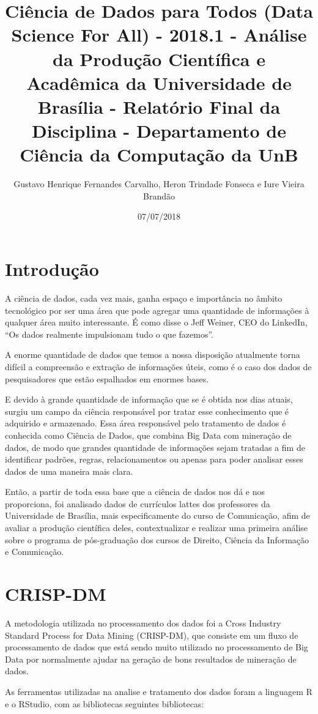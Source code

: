 \documentclass[]{article}
\title{Ciência de Dados para Todos (Data Science For All) - 2018.1 - Análise da
Produção Científica e Acadêmica da Universidade de Brasília - Relatório
Final da Disciplina - Departamento de Ciência da Computação da UnB}
\author{Gustavo Henrique Fernandes Carvalho, Heron Trindade Fonseca e Iure
Vieira Brandão}
\date{07/07/2018}
\begin{document}
\maketitle

\section{Introdução}\label{introducao}

A ciência de dados, cada vez mais, ganha espaço e importância no âmbito
tecnológico por ser uma área que pode agregar uma quantidade de
informações à qualquer área muito interessante. É como disse o Jeff
Weiner, CEO do LinkedIn, ``Os dados realmente impulsionam tudo o que
fazemos''.

A enorme quantidade de dados que temos a nossa disposição atualmente
torna difícil a compreensão e extração de informações úteis, como é o
caso dos dados de pesquisadores que estão espalhados em enormes bases.

E devido à grande quantidade de informação que se é obtida nos dias
atuais, surgiu um campo da ciência responsável por tratar esse
conhecimento que é adquirido e armazenado. Essa área responsável pelo
tratamento de dados é conhecida como Ciência de Dados, que combina Big
Data com mineração de dados, de modo que grandes quantidade de
informações sejam tratadas a fim de identificar padrões, regras,
relacionamentos ou apenas para poder analisar esses dados de uma maneira
mais clara.

Então, a partir de toda essa base que a ciência de dados nos dá e nos
proporciona, foi analisado dados de currículos lattes dos professores da
Universidade de Brasília, mais especificamente do curso de Comunicação,
afim de avaliar a produção científica deles, contextualizar e realizar
uma primeira análise sobre o programa de pós-graduação dos cursos de
Direito, Ciência da Informação e Comunicação.

\section{CRISP-DM}\label{crisp-dm}

A metodologia utilizada no processamento dos dados foi a Cross Industry
Standard Process for Data Mining (CRISP-DM), que consiste em um fluxo de
processamento de dados que está sendo muito utilizado no processamento
de Big Data por normalmente ajudar na geração de bons resultados de
mineração de dados.

As ferramentas utilizadas na analise e tratamento dos dados foram a
linguagem R e o RStudio, com as bibliotecas seguintes bibliotecas:
\end{document}
